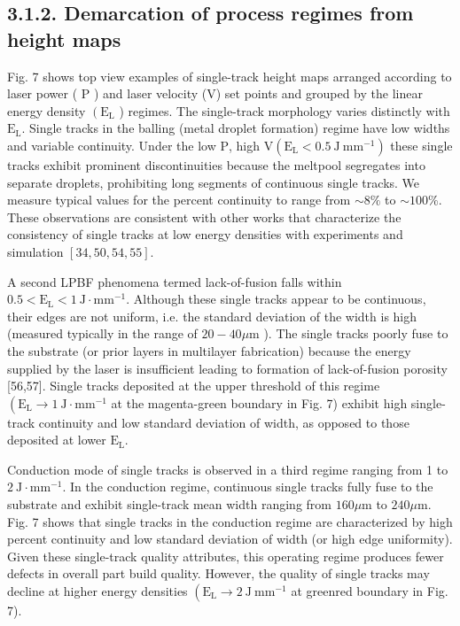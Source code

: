 \documentclass[10pt]{article}
\begin{document}
\subsection*{3.1.2. Demarcation of process regimes from height maps}
Fig. 7 shows top view examples of single-track height maps arranged according to laser power ( $\mathrm{P}$ ) and laser velocity (V) set points and grouped by the linear energy density $\left(\mathrm{E}_{\mathrm{L}}\right.$ ) regimes. The single-track morphology varies distinctly with $\mathrm{E}_{\mathrm{L}}$. Single tracks in the balling (metal droplet formation) regime have low widths and variable continuity. Under the low $\mathrm{P}$, high $\mathrm{V}\left(\mathrm{E}_{\mathrm{L}}<0.5 \mathrm{~J} \mathrm{~mm}^{-1}\right)$ these single tracks exhibit prominent discontinuities because the meltpool segregates into separate droplets, prohibiting long segments of continuous single tracks. We measure typical values for the percent continuity to range from $\sim 8 \%$ to $\sim 100 \%$. These observations are consistent with other works that characterize the consistency of single tracks at low energy densities with experiments and simulation $[34,50,54,55]$.

A second LPBF phenomena termed lack-of-fusion falls within $0.5<\mathrm{E}_{\mathrm{L}}<1 \mathrm{~J} \cdot \mathrm{mm}^{-1}$. Although these single tracks appear to be continuous, their edges are not uniform, i.e. the standard deviation of the width is high (measured typically in the range of $20-40 \mu \mathrm{m}$ ). The single tracks poorly fuse to the substrate (or prior layers in multilayer fabrication) because the energy supplied by the laser is insufficient leading to formation of lack-of-fusion porosity [56,57]. Single tracks deposited at the upper threshold of this regime $\left(\mathrm{E}_{\mathrm{L}} \rightarrow 1 \mathrm{~J} \cdot \mathrm{mm}^{-1}\right.$ at the magenta-green boundary in Fig. 7) exhibit high single-track continuity and low standard deviation of width, as opposed to those deposited at lower $\mathrm{E}_{\mathrm{L}}$.

Conduction mode of single tracks is observed in a third regime ranging from 1 to $2 \mathrm{~J} \cdot \mathrm{mm}^{-1}$. In the conduction regime, continuous single tracks fully fuse to the substrate and exhibit single-track mean width ranging from $160 \mu \mathrm{m}$ to $240 \mu \mathrm{m}$. Fig. 7 shows that single tracks in the conduction regime are characterized by high percent continuity and low standard deviation of width (or high edge uniformity). Given these single-track quality attributes, this operating regime produces fewer defects in overall part build quality. However, the quality of single tracks may decline at higher energy densities $\left(\mathrm{E}_{\mathrm{L}} \rightarrow 2 \mathrm{~J} \mathrm{~mm}^{-1}\right.$ at greenred boundary in Fig. 7).
\end{document}
